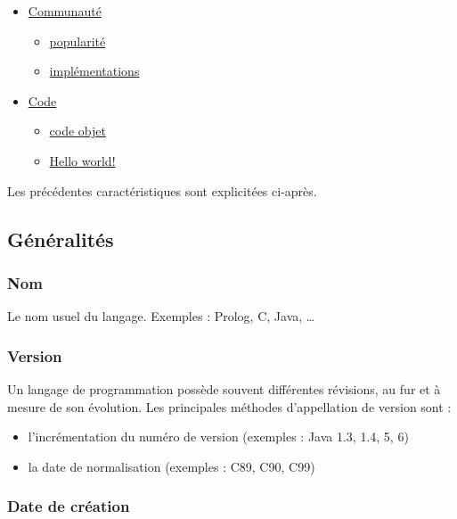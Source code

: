 \begin{itemize}
\begin{itemize}
	\end{itemize}
\item \hyperref[communaute]{Communauté}
	\begin{itemize}
	\item \hyperref[popularite]{popularité}
	\item \hyperref[implementations]{implémentations}\\
	\end{itemize}
\item \hyperref[code]{Code}
	\begin{itemize}
	\item \hyperref[objet]{code objet}
	\item \hyperref[hello]{Hello world!}\\
	\end{itemize}
\end{itemize}

Les précédentes caractéristiques sont explicitées ci-après.

\subsection{Généralités}
\label{generalites}

\subsubsection{Nom}
\label{nom}

Le nom usuel du langage. Exemples : Prolog, C, Java, …

\subsubsection{Version}
\label{version}

Un langage de programmation possède souvent différentes révisions, au fur et à mesure de son évolution. Les principales méthodes d'appellation de version sont :
\begin{itemize}
\item l'incrémentation du numéro de version (exemples : Java 1.3, 1.4, 5, 6)
\item la date de normalisation (exemples : C89, C90, C99)
\end{itemize}

\subsubsection{Date de création}
\label{date_creation}

